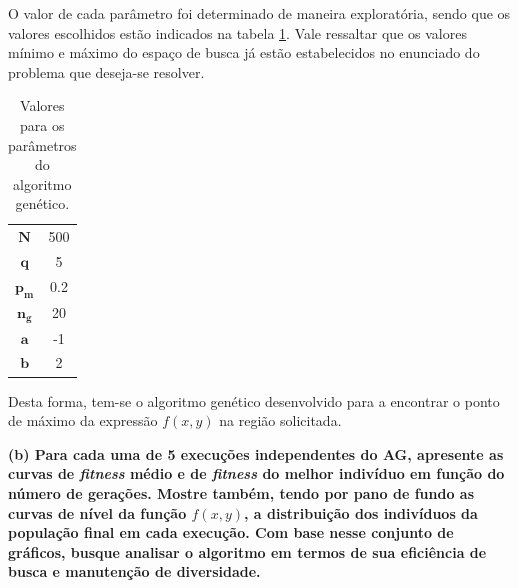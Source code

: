 \documentclass[a4paper, 12pt]{article}
\newcommand{\fitness}{\textit{fitness}\xspace}
\begin{document}
O valor de cada parâmetro foi determinado de maneira exploratória, sendo que os valores escolhidos estão indicados na tabela \ref{tab:valores-parametros}. Vale ressaltar que os valores mínimo e máximo do espaço de busca já estão estabelecidos no enunciado do problema que deseja-se resolver.
\begin{table}[H]
    \centering
    \begin{tabular}{c c}
    \toprule
        $\bm{N}$ & 500\\
        $\bm{q}$ & 5\\
        $\bm{p_m}$ & 0.2\\
        $\bm{n_g}$ & 20\\
        $\bm{a}$ & -1\\
        $\bm{b}$ & 2\\
    \bottomrule
    \end{tabular}
    \caption{Valores para os parâmetros do algoritmo genético.}
    \label{tab:valores-parametros}
\end{table}

Desta forma, tem-se o algoritmo genético desenvolvido para a encontrar o ponto de máximo da expressão $f(x, y)$ na região solicitada.

\textbf{(b) Para cada uma de 5 execuções independentes do AG, apresente as curvas de \fitness médio e de \fitness do melhor indivíduo em função do número de gerações. Mostre também, tendo por pano de fundo as curvas de nível da função $f(x, y)$, a distribuição dos indivíduos da população final em cada execução. Com base nesse conjunto de gráficos, busque analisar o algoritmo em termos de sua eficiência de busca e manutenção de diversidade.}
\end{document}
